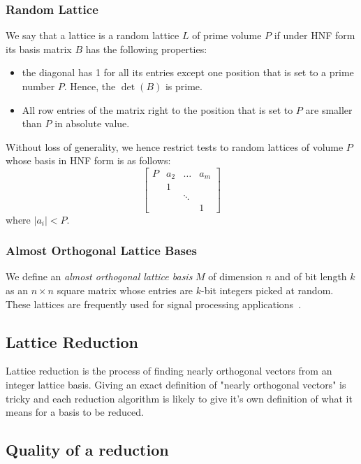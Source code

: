 \documentclass[10pt, a4paper]{article}
\begin{document}
\subsubsection{Random Lattice}

We say that a lattice is a random lattice $L$ of prime volume $P$ if under HNF form its basis matrix $B$ has the following properties:

\begin{itemize}
\item the diagonal has 1 for all its entries except one position that is set to a prime number $P$. Hence, the $\det(B)$ is prime.
\item All row entries of the matrix right to the position that is set to $P$ are smaller than $P$ in absolute value.
\end{itemize}

Without loss of generality, we hence restrict tests to random lattices of volume $P$ whose basis in HNF form is as follows: $$\left[\begin{array}{ccccc}
P & a_2 & \dots & a_{m}\\
& 1&   & \\ 
& & \ddots & \\ 
 & & &1 
\end{array}\right]$$
where $|a_i| < P$.

\subsubsection{Almost Orthogonal Lattice Bases}

We define an \emph{almost orthogonal lattice basis} $M$ of dimension $n$ and of bit length $k$ as an $n \times n$ square matrix whose entries are $k$-bit integers picked at random. These lattices are frequently used for signal processing applications~\cite{originalJacobiMethodLatticeBasisReduction}.

\subsection{Lattice Reduction}

Lattice reduction is the process of finding nearly orthogonal vectors from an integer lattice basis. Giving an exact definition of "nearly orthogonal vectors" is tricky and each reduction algorithm is likely to give it's own definition of what it means for a basis to be reduced.

\subsection{Quality of a reduction}
\end{document}
